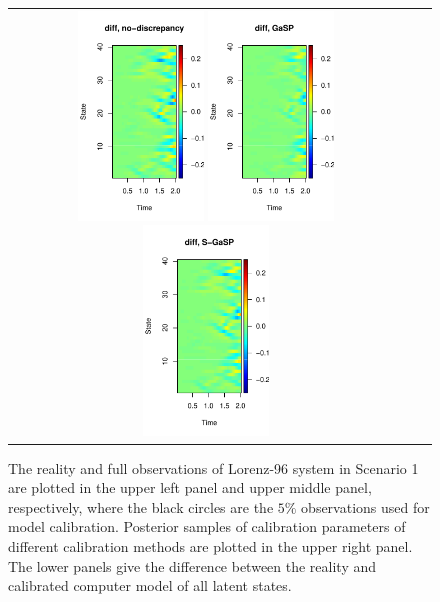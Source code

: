 \begin{figure}[t]
\begin{tabular}{ccc}
	\hspace{-.1in} \includegraphics[height=0.5\textwidth,width=0.33\textwidth]{figures/no_discrepancy_Lorenz_96.pdf}
	\hspace{-.1in} \includegraphics[height=0.5\textwidth,width=0.33\textwidth]{figures/gasp_Lorenz_96.pdf}
		\hspace{-.1in} \includegraphics[height=0.5\textwidth,width=0.33\textwidth]{figures/sgasp_discrepancy_Lorenz_96.pdf} \vspace{-.15in}

\end{tabular}
   \caption{The reality and full observations of Lorenz-96 system in Scenario 1 are plotted in the upper left panel and upper middle panel, respectively, where the black circles are the $5\%$ observations used for model calibration.  Posterior samples of calibration parameters of different calibration methods are plotted in the upper right panel.  The lower panels give the  difference between the reality and calibrated computer model  of all latent states.   }
 \label{fig:lorenz_96}
\end{figure}


